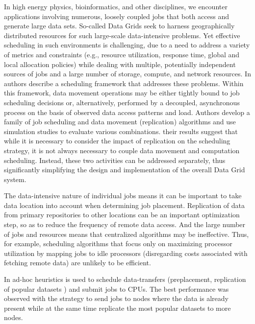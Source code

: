 \documentclass[a4paper,10pt]{article}
\begin{document}
In high energy physics, bioinformatics, and other disciplines, we encounter applications involving numerous, loosely coupled jobs that both access and generate large data sets. So-called Data Grids seek to harness geographically distributed resources for such large-scale data-intensive problems. Yet effective scheduling in such environments is challenging, due to
a need to address a variety of metrics and constraints (e.g., resource utilization, response time, global and local allocation policies) while dealing with multiple, potentially independent sources of jobs and a large number of storage, compute, and network resources. In \cite{Globus: scheduler} authors describe a scheduling framework that addresses these problems. Within this framework, data movement operations may be either tightly bound to job scheduling decisions or, alternatively, performed by a decoupled, asynchronous process on the basis of observed data access patterns and load. Authors develop a family of job scheduling and data movement (replication) algorithms and use simulation studies to evaluate various combinations. their results suggest that
while it is necessary to consider the impact of replication on the scheduling strategy, it is not always necessary to couple data movement and computation scheduling. Instead, these two activities can be addressed separately, thus significantly simplifying the design and implementation of the overall Data Grid system. \cite{Globus: scheduler}


The data-intensive nature of individual jobs means it can be important to take data location into account when determining job placement. Replication of data from primary repositories to other locations can be an important optimization step, so as to reduce the frequency of remote data access. And the large number of jobs and resources means that centralized algorithms may be ineffective. Thus, for example, scheduling algorithms that focus only on maximizing processor
utilization by mapping jobs to idle processors (disregarding costs associated with fetching remote data) are unlikely to be efficient.\cite{Globus: scheduler}

In \cite{Globus: scheduler} ad-hoc heuristics is used to schedule data-transfers (preplacement, replication of popular datasets ) and submit jobs to CPUs. The best performance was observed with the strategy to send jobs to nodes where the data is already present while at the same time replicate the most popular datasets to more nodes. 
\end{document}
